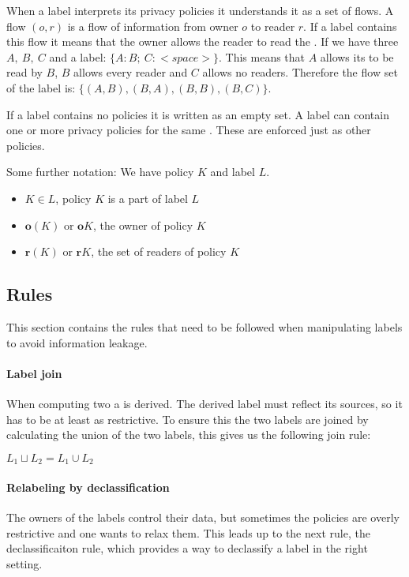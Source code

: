 When a label interprets its privacy policies it understands it as a set of flows.
A flow $(o,r)$ is a flow of information from owner $o$ to reader $r$.
If a label contains this flow it means that the owner allows the reader to read the \xvalue{}.
If we have three \principals{} $A,\ B,\ C$ and a label: $\{A: B; \ C: <space> \}$.
This means that $A$ allows its \xvalue{} to be read by $B$, $B$ allows every reader and $C$ allows no readers.
Therefore the flow set of the label is: $\{(A,B), (B,A), (B,B), (B,C) \}$.

If a label contains no policies it is written as an empty set.
A label can contain one or more privacy policies for the same \principal{}.
These are enforced just as other policies.

Some further notation:
We have policy $K$ and label $L$.
\begin{itemize}
\item $K \in L$, policy $K$ is a part of label $L$
\item $\textbf{o}(K)$ or $\textbf{o}K$, the owner of policy $K$
\item $\textbf{r}(K)$ or $\textbf{r}K$, the set of readers of policy $K$
\end{itemize}

\subsection{Rules}
This section contains the rules that need to be followed when manipulating labels to avoid information leakage.

\paragraph{Label join}
When computing two \xvalues{} a \xvalue{} is derived.
The derived \xvalues{} label must reflect its sources, so it has to be at least as restrictive.
To ensure this the two labels are joined by calculating the union of the two labels, this gives us the following join rule:
\begin{definition}
  $L_1 \sqcup L_2 = L_1 \cup L_2$
\end{definition}


\paragraph{Relabeling by declassification}
The owners of the labels control their data, but sometimes the policies are overly restrictive and one wants to relax them.
This leads up to the next rule, the declassificaiton rule, which provides a way to declassify a label in the right setting.

